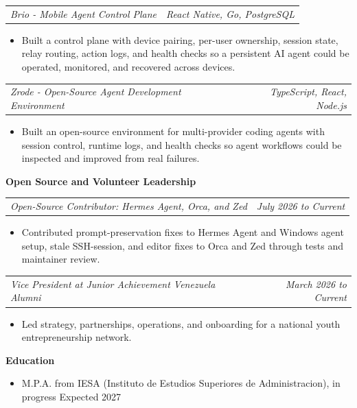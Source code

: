 \documentclass[10pt,letterpaper]{article}
\makeatletter
\newcommand{\bodyfont}{\fontsize{10.5}{15.75}\selectfont}
\newcommand{\sectiontitle}[1]{%
  \vspace{4pt}
  {\bodyfont\textbf{#1}}\par
  \nopagebreak[4]
  \vspace{2pt}
}
\newcommand{\roleline}[2]{%
  \begin{tabularx}{\textwidth}{@{}Xr@{}}
    \bodyfont\textit{#1} & \bodyfont\textit{#2}
  \end{tabularx}
  \nopagebreak[4]
  \vspace{1pt}
}
\makeatother
\begin{document}
\vspace{3pt}
\roleline{Brio - Mobile Agent Control Plane}{React Native, Go, PostgreSQL}
\begin{itemize}
  \item Built a control plane with device pairing, per-user ownership, session state, relay routing, action logs, and health checks so a persistent AI agent could be operated, monitored, and recovered across devices.
\end{itemize}

\vspace{3pt}
\roleline{Zrode - Open-Source Agent Development Environment}{TypeScript, React, Node.js}
\begin{itemize}
  \item Built an open-source environment for multi-provider coding agents with session control, runtime logs, and health checks so agent workflows could be inspected and improved from real failures.
\end{itemize}

\sectiontitle{Open Source and Volunteer Leadership}

\roleline{Open-Source Contributor: Hermes Agent, Orca, and Zed}{July 2026 to Current}
\begin{itemize}
  \item Contributed prompt-preservation fixes to Hermes Agent and Windows agent setup, stale SSH-session, and editor fixes to Orca and Zed through tests and maintainer review.
\end{itemize}

\vspace{3pt}
\roleline{Vice President at Junior Achievement Venezuela Alumni}{March 2026 to Current}
\begin{itemize}
  \item Led strategy, partnerships, operations, and onboarding for a national youth entrepreneurship network.
\end{itemize}

\sectiontitle{Education}
\begin{itemize}
  \item M.P.A. from IESA (Instituto de Estudios Superiores de Administracion), in progress \hfill Expected 2027
\end{itemize}
\end{document}
